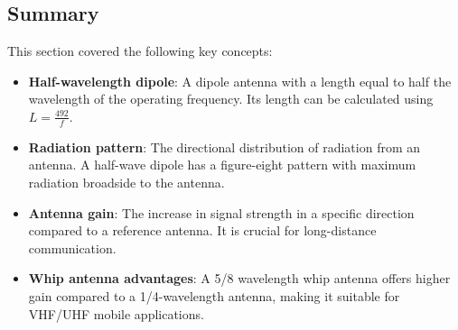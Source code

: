 \subsection*{Summary}
This section covered the following key concepts:
\begin{itemize}
    \item \textbf{Half-wavelength dipole}: A dipole antenna with a length equal to half the wavelength of the operating frequency. Its length can be calculated using \( L = \frac{492}{f} \).
    \item \textbf{Radiation pattern}: The directional distribution of radiation from an antenna. A half-wave dipole has a figure-eight pattern with maximum radiation broadside to the antenna.
    \item \textbf{Antenna gain}: The increase in signal strength in a specific direction compared to a reference antenna. It is crucial for long-distance communication.
    \item \textbf{Whip antenna advantages}: A 5/8 wavelength whip antenna offers higher gain compared to a 1/4-wavelength antenna, making it suitable for VHF/UHF mobile applications.
\end{itemize}
